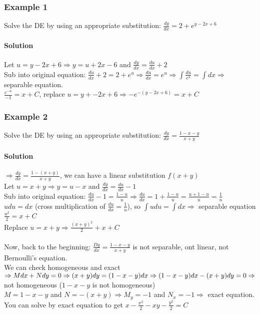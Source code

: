 \documentclass{article}
\begin{document}
\subsubsection{Example 1}
Solve the DE by using an appropriate substitution: $\frac{dy}{dx}=2+e^{y-2x+6}$
\paragraph{Solution} Let $u=y-2x+6\Rightarrow y=u+2x-6$ and $\frac{dy}{dx}=\frac{du}{dx}+2$
\\Sub into original equation: $\frac{du}{dx}+2=2+e^u\Rightarrow\frac{du}{dx}=e^u\Rightarrow\int\frac{du}{e^u}=\int{dx}\Rightarrow$ separable equation.
\\$\frac{e^{-u}}{-1}=x+C$, replace $u=y+-2x+6\Rightarrow -e^{-(y-2x+6)}=x+C$

\subsubsection{Example 2}
Solve the DE by using an appropriate substitution: $\frac{dy}{dx}=\frac{1-x-y}{x+y}$
\paragraph{Solution} $\Rightarrow \frac{dy}{dx}=\frac{1-(x+y)}{x+y}$, we can have a linear substitution $f(x+y)$
\\Let $u=x+y\Rightarrow y=u-x$ and $\frac{dy}{dx}=\frac{du}{dx}-1$
\\Sub into original equation: $\frac{du}{dx}-1=\frac{1-u}{u}\Rightarrow\frac{du}{dx}=1+\frac{1-u}{u}=\frac{u+1-u}{u}=\frac{1}{u}$
\\$udu=dx$ (cross multiplication of $\frac{du}{dx}=\frac{1}{u}$), so $\int udu=\int dx\Rightarrow$ separable equation
\\$\frac{u^2}{2}=x+C$
\\Replace $u=x+y\Rightarrow\frac{(x+y)^2}{2}+x+C$
\\\\Now, back to the beginning: $\frac{Dy}{dx}=\frac{1-x-y}{x+y}$ is not separable, ont linear, not Bernoulli's equation.
\\We can check homogeneous and exact$\Rightarrow Mdx+Ndy=0\Rightarrow(x+y)dy=(1-x-y)dx
\\\Rightarrow(1-x-y)dx-(x+y)dy=0\Rightarrow$ not homogeneous ($1-x-y$ is not homogeneous)
\\$M=1-x-y$ and $N=-(x+y)\Rightarrow M_y=-1$ and $N_x=-1\Rightarrow$ exact equation.
\\You can solve by exact equation to get $x-\frac{x^2}{2}-xy-\frac{y^2}{2}=C$
\end{document}
